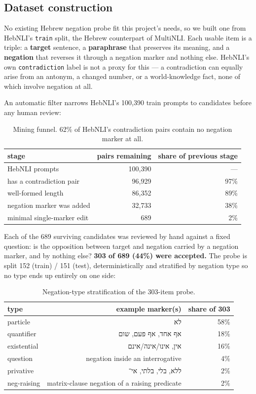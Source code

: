 \documentclass{article}
\newcommand{\heb}[1]{{\hebrewfont #1}}
\begin{document}
\subsection{Dataset construction}
\label{sec:dataset}

No existing Hebrew negation probe fit this project's needs, so we built one
from HebNLI's \texttt{train} split, the Hebrew counterpart of MultiNLI.
Each usable item is a triple: a \textbf{target} sentence, a
\textbf{paraphrase} that preserves its meaning, and a \textbf{negation}
that reverses it through a negation marker and nothing else. HebNLI's own
\texttt{contradiction} label is not a proxy for this --- a contradiction
can equally arise from an antonym, a changed number, or a world-knowledge
fact, none of which involve negation at all.

An automatic filter narrows HebNLI's 100{,}390 train prompts to candidates
before any human review:

\begin{table}[h]
\centering
\small
\begin{tabular}{lrr}
\toprule
stage & pairs remaining & share of previous stage \\
\midrule
HebNLI prompts & 100{,}390 & --- \\
has a contradiction pair & 96{,}929 & 97\% \\
well-formed length & 86{,}352 & 89\% \\
negation marker was added & 32{,}733 & 38\% \\
minimal single-marker edit & 689 & 2\% \\
\bottomrule
\end{tabular}
\caption{Mining funnel. 62\% of HebNLI's contradiction pairs contain no
negation marker at all.}
\label{tab:funnel}
\end{table}

Each of the 689 surviving candidates was reviewed by hand against a fixed
question: is the opposition between target and negation carried by a
negation marker, and by nothing else? \textbf{303 of 689 (44\%) were
accepted.} The probe is split 152 (train) / 151 (test), deterministically
and stratified by negation type so no type ends up entirely on one side:

\begin{table}[h]
\centering
\small
\begin{tabular}{lrr}
\toprule
type & example marker(s) & share of 303 \\
\midrule
particle & \heb{לא} & 58\% \\
quantifier & \heb{אף אחד}, \heb{אף פעם}, \heb{שום} & 18\% \\
existential & \heb{אין}, \heb{אינו}/\heb{אינה}/\heb{אינם} & 16\% \\
question & negation inside an interrogative & 4\% \\
privative & \heb{ללא}, \heb{בלי}, \heb{בלתי}, \heb{אי־} & 2\% \\
neg-raising & matrix-clause negation of a raising predicate & 2\% \\
\bottomrule
\end{tabular}
\caption{Negation-type stratification of the 303-item probe.}
\label{tab:categories}
\end{table}
\end{document}
